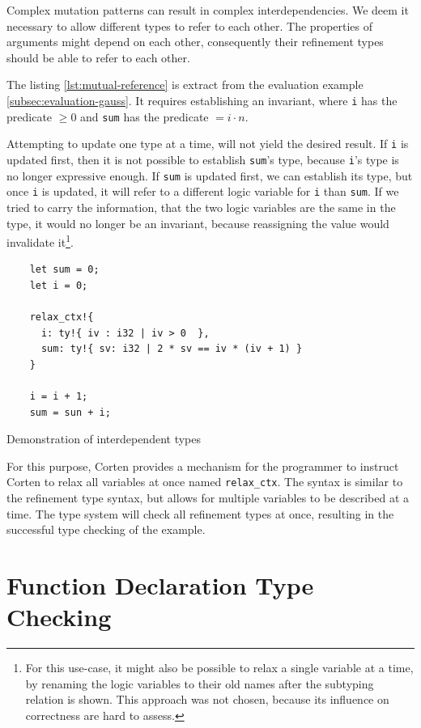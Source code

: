 \documentclass{book}
\newcommand{\code}[1]{\texttt{#1}}
\theoremstyle{definition}
\begin{document}
Complex mutation patterns can result in complex interdependencies. We deem it necessary to allow different types to refer to each other. 
The properties of arguments might depend on each other, consequently their refinement types should be able to refer to each other.

The listing \ref{lst:mutual-reference} is extract from the evaluation example \ref{subsec:evaluation-gauss}. It requires establishing an invariant, where \code{i} has the predicate $\geq 0$ and \code{sum} has the predicate $= i \cdot n$.

Attempting to update one type at a time, will not yield the desired result. If \code{i} is updated first, then it is not possible to establish \code{sum}'s type, because \code{i}'s type is no longer expressive enough.
If \code{sum} is updated first, we can establish its type, but once \code{i} is updated, it will refer to a different logic variable for \code{i} than \code{sum}. If we tried to carry the information, that the two logic variables are the same in the type, it would no longer be an invariant, because reassigning the value would invalidate it\footnote{
  For this use-case, it might also be possible to relax a single variable at a time, by renaming the logic variables to their old names after the subtyping relation is shown. This approach was not chosen, because its influence on correctness are hard to assess.
}.

\begin{listing}[ht]
  \begin{verbatim}
    let sum = 0;
    let i = 0;
    
    relax_ctx!{
      i: ty!{ iv : i32 | iv > 0  },
      sum: ty!{ sv: i32 | 2 * sv == iv * (iv + 1) }
    }

    i = i + 1;
    sum = sun + i;

  \end{verbatim}
  \caption{Demonstration of interdependent types}
  \label{lst:mutual-reference}
\end{listing}

For this purpose, Corten provides a mechanism for the programmer to instruct Corten to relax all variables at once \- named \code{relax\_ctx}. The syntax is similar to the refinement type syntax, but allows for multiple variables to be described at a time. The type system will check all refinement types at once, resulting in the successful type checking of the example.

\section{Function Declaration Type Checking}
\end{document}
